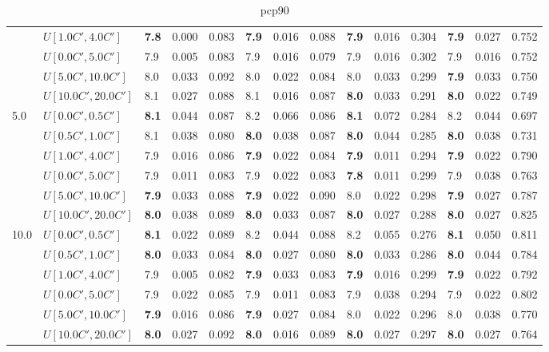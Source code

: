 \begin{table}[h]
{\begin{tabular}{|l|l||l|l|l||l|l|l||l|l|l||l|l|l|}
       & $U[1.0C',4.0C']$ & \textbf{7.8} & 0.000 & 0.083 & \textbf{7.9} & 0.016 & 0.088 & \textbf{7.9} & 0.016 & 0.304 & \textbf{7.9} & 0.027 & 0.752 \\
       & $U[0.0C',5.0C']$ & 7.9 & 0.005 & 0.083 & 7.9 & 0.016 & 0.079 & 7.9 & 0.016 & 0.302 & 7.9 & 0.016 & 0.752 \\
       & $U[5.0C',10.0C']$ & 8.0 & 0.033 & 0.092 & 8.0 & 0.022 & 0.084 & 8.0 & 0.033 & 0.299 & \textbf{7.9} & 0.033 & 0.750 \\
       & $U[10.0C',20.0C']$ & 8.1 & 0.027 & 0.088 & 8.1 & 0.016 & 0.087 & \textbf{8.0} & 0.033 & 0.291 & \textbf{8.0} & 0.022 & 0.749 \\
      \hline\hline
      \multirow{6}{*}{5.0} & $U[0.0C',0.5C']$ & \textbf{8.1} & 0.044 & 0.087 & 8.2 & 0.066 & 0.086 & \textbf{8.1} & 0.072 & 0.284 & 8.2 & 0.044 & 0.697 \\
       & $U[0.5C',1.0C']$ & 8.1 & 0.038 & 0.080 & \textbf{8.0} & 0.038 & 0.087 & \textbf{8.0} & 0.044 & 0.285 & \textbf{8.0} & 0.038 & 0.731 \\
       & $U[1.0C',4.0C']$ & 7.9 & 0.016 & 0.086 & \textbf{7.9} & 0.022 & 0.084 & \textbf{7.9} & 0.011 & 0.294 & \textbf{7.9} & 0.022 & 0.790 \\
       & $U[0.0C',5.0C']$ & 7.9 & 0.011 & 0.083 & 7.9 & 0.022 & 0.083 & \textbf{7.8} & 0.011 & 0.299 & 7.9 & 0.038 & 0.763 \\
       & $U[5.0C',10.0C']$ & \textbf{7.9} & 0.033 & 0.088 & \textbf{7.9} & 0.022 & 0.090 & 8.0 & 0.022 & 0.298 & \textbf{7.9} & 0.027 & 0.787 \\
       & $U[10.0C',20.0C']$ & \textbf{8.0} & 0.038 & 0.089 & \textbf{8.0} & 0.033 & 0.087 & \textbf{8.0} & 0.027 & 0.288 & \textbf{8.0} & 0.027 & 0.825 \\
      \hline\hline
      \multirow{6}{*}{10.0} & $U[0.0C',0.5C']$ & \textbf{8.1} & 0.022 & 0.089 & 8.2 & 0.044 & 0.088 & 8.2 & 0.055 & 0.276 & \textbf{8.1} & 0.050 & 0.811 \\
       & $U[0.5C',1.0C']$ & \textbf{8.0} & 0.033 & 0.084 & \textbf{8.0} & 0.027 & 0.080 & \textbf{8.0} & 0.033 & 0.286 & \textbf{8.0} & 0.044 & 0.784 \\
       & $U[1.0C',4.0C']$ & 7.9 & 0.005 & 0.082 & \textbf{7.9} & 0.033 & 0.083 & \textbf{7.9} & 0.016 & 0.299 & \textbf{7.9} & 0.022 & 0.792 \\
       & $U[0.0C',5.0C']$ & 7.9 & 0.022 & 0.085 & 7.9 & 0.011 & 0.083 & 7.9 & 0.038 & 0.294 & 7.9 & 0.022 & 0.802 \\
       & $U[5.0C',10.0C']$ & \textbf{7.9} & 0.016 & 0.086 & \textbf{7.9} & 0.027 & 0.084 & 8.0 & 0.022 & 0.296 & 8.0 & 0.038 & 0.770 \\
       & $U[10.0C',20.0C']$ & \textbf{8.0} & 0.027 & 0.092 & \textbf{8.0} & 0.016 & 0.089 & \textbf{8.0} & 0.027 & 0.297 & \textbf{8.0} & 0.027 & 0.764 \\
      \hline
      \end{tabular}
      }
      \caption{pcp90}
      \label{tab:pcp90}\end{table}      
      

